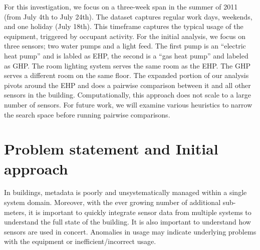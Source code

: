 For this investigation, we focus on a three-week span in the summer of 2011 (from July 4th to July 24th).
The dataset captures regular work days, weekends, and one holiday (July 18th).  This timeframe captures
the typical usage of the equipment, triggered by occupant activity.  For the initial
analysis, we focus on three sensors; two water pumps and a light feed.  The first pump is an 
``electric heat pump'' and is labled as EHP, the second  is a ``gas heat pump''
and labeled as GHP.  The room lighting system serves the same room as the EHP.  The GHP
serves a different room on the same floor.  The expanded portion of our analysis pivots around the EHP
and does a pairwise comparison between it and all other sensors in the building.
Computationally, this approach does not scale to a large number of sensors.  For future work, we will
examine various heuristics to narrow the search space before running pairwise comparisons.




\section{Problem statement and Initial approach}\label{problem}

In buildings, metadata is poorly and unsystematically managed within a single system domain.  Moreover, 
with the ever growing number of additional sub-meters, it is important to quickly integrate
sensor data from multiple systems to understand the full state of the building.  It is also important to 
understand how sensors are used in concert.  Anomalies in usage may indicate underlying problems with 
the equipment or inefficient/incorrect usage.  

